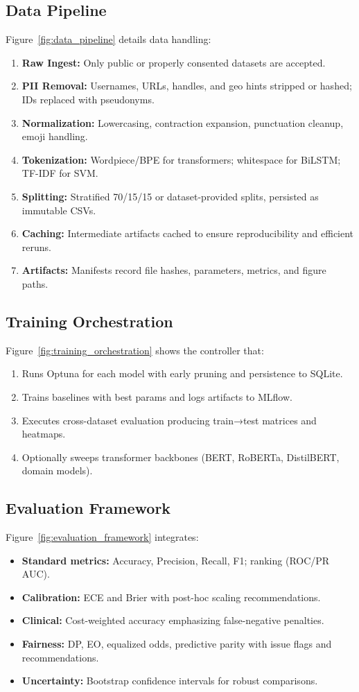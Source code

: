\documentclass[conference]{IEEEtran}
\begin{document}
\subsection{Data Pipeline}
Figure~\ref{fig:data_pipeline} details data handling:
\begin{enumerate}
  \item \textbf{Raw Ingest:} Only public or properly consented datasets are accepted.
  \item \textbf{PII Removal:} Usernames, URLs, handles, and geo hints stripped or hashed; IDs replaced with pseudonyms.
  \item \textbf{Normalization:} Lowercasing, contraction expansion, punctuation cleanup, emoji handling.
  \item \textbf{Tokenization:} Wordpiece/BPE for transformers; whitespace for BiLSTM; TF-IDF for SVM.
  \item \textbf{Splitting:} Stratified 70/15/15 or dataset-provided splits, persisted as immutable CSVs.
  \item \textbf{Caching:} Intermediate artifacts cached to ensure reproducibility and efficient reruns.
  \item \textbf{Artifacts:} Manifests record file hashes, parameters, metrics, and figure paths.
\end{enumerate}

\subsection{Training Orchestration}
Figure~\ref{fig:training_orchestration} shows the controller that:
\begin{enumerate}
  \item Runs Optuna for each model with early pruning and persistence to SQLite.
  \item Trains baselines with best params and logs artifacts to MLflow.
  \item Executes cross-dataset evaluation producing train→test matrices and heatmaps.
  \item Optionally sweeps transformer backbones (BERT, RoBERTa, DistilBERT, domain models).
\end{enumerate}

\subsection{Evaluation Framework}
Figure~\ref{fig:evaluation_framework} integrates:
\begin{itemize}
  \item \textbf{Standard metrics:} Accuracy, Precision, Recall, F1; ranking (ROC/PR AUC).
  \item \textbf{Calibration:} ECE and Brier with post-hoc scaling recommendations.
  \item \textbf{Clinical:} Cost-weighted accuracy emphasizing false-negative penalties.
  \item \textbf{Fairness:} DP, EO, equalized odds, predictive parity with issue flags and recommendations.
  \item \textbf{Uncertainty:} Bootstrap confidence intervals for robust comparisons.
\end{itemize}
\end{document}
